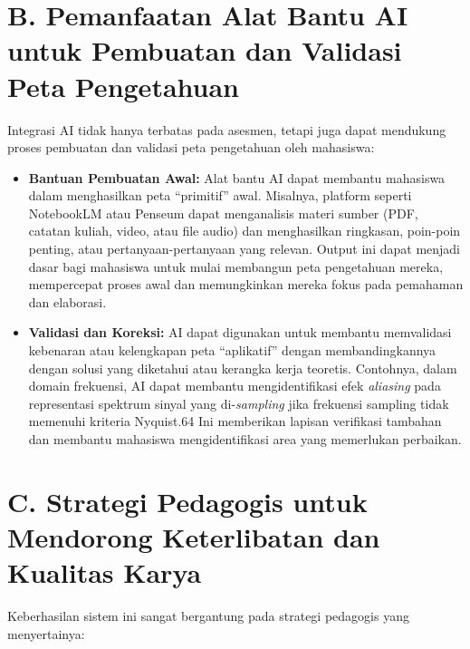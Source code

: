 \documentclass[
  letterpaper,
  DIV=11,
  numbers=noendperiod]{scrreprt}
\begin{document}
\section{B. Pemanfaatan Alat Bantu AI untuk Pembuatan dan Validasi Peta
Pengetahuan}\label{b.-pemanfaatan-alat-bantu-ai-untuk-pembuatan-dan-validasi-peta-pengetahuan}

Integrasi AI tidak hanya terbatas pada asesmen, tetapi juga dapat
mendukung proses pembuatan dan validasi peta pengetahuan oleh mahasiswa:

\begin{itemize}
\item
  \textbf{Bantuan Pembuatan Awal:} Alat bantu AI dapat membantu
  mahasiswa dalam menghasilkan peta ``primitif'' awal. Misalnya,
  platform seperti NotebookLM atau Penseum dapat menganalisis materi
  sumber (PDF, catatan kuliah, video, atau file audio) dan menghasilkan
  ringkasan, poin-poin penting, atau pertanyaan-pertanyaan yang relevan.
  Output ini dapat menjadi dasar bagi mahasiswa untuk mulai membangun
  peta pengetahuan mereka, mempercepat proses awal dan memungkinkan
  mereka fokus pada pemahaman dan elaborasi.
\item
  \textbf{Validasi dan Koreksi:} AI dapat digunakan untuk membantu
  memvalidasi kebenaran atau kelengkapan peta ``aplikatif'' dengan
  membandingkannya dengan solusi yang diketahui atau kerangka kerja
  teoretis. Contohnya, dalam domain frekuensi, AI dapat membantu
  mengidentifikasi efek \emph{aliasing} pada representasi spektrum
  sinyal yang di-\emph{sampling} jika frekuensi sampling tidak memenuhi
  kriteria Nyquist.64 Ini memberikan lapisan verifikasi tambahan dan
  membantu mahasiswa mengidentifikasi area yang memerlukan perbaikan.
\end{itemize}

\section{C. Strategi Pedagogis untuk Mendorong Keterlibatan dan Kualitas
Karya}\label{c.-strategi-pedagogis-untuk-mendorong-keterlibatan-dan-kualitas-karya}

Keberhasilan sistem ini sangat bergantung pada strategi pedagogis yang
menyertainya:
\end{document}
